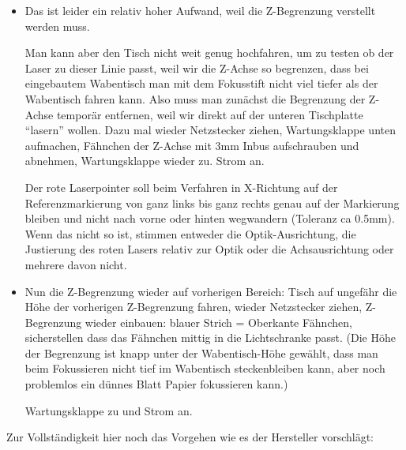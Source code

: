 \documentclass{\basedir/fablab-document}
\begin{document}
	\begin{itemize}
		\item Das ist leider ein relativ hoher Aufwand, weil die Z-Begrenzung verstellt werden muss.

		Man kann aber den Tisch nicht weit genug hochfahren, um zu testen ob der Laser zu dieser Linie passt, weil wir die Z-Achse so begrenzen, dass bei eingebautem Wabentisch man mit dem Fokusstift nicht viel tiefer als der Wabentisch fahren kann. Also muss man zunächst die Begrenzung der Z-Achse temporär entfernen, weil wir direkt auf der unteren Tischplatte \enquote{lasern} wollen. Dazu mal wieder Netzstecker ziehen, Wartungsklappe unten aufmachen, Fähnchen der Z-Achse mit 3mm Inbus aufschrauben und abnehmen, Wartungsklappe wieder zu. Strom an.

		Der rote Laserpointer soll beim Verfahren in X-Richtung auf der Referenzmarkierung von ganz links bis ganz rechts genau auf der Markierung bleiben und nicht nach vorne oder hinten wegwandern (Toleranz ca 0.5mm). Wenn das nicht so ist, stimmen entweder die Optik-Ausrichtung, die Justierung des roten Lasers relativ zur Optik oder die Achsausrichtung oder mehrere davon nicht.

		\item Nun die Z-Begrenzung wieder auf vorherigen Bereich: Tisch auf ungefähr die Höhe der vorherigen Z-Begrenzung fahren, wieder Netzstecker ziehen, Z-Begrenzung wieder einbauen: blauer Strich = Oberkante Fähnchen, sicherstellen dass das Fähnchen mittig in die Lichtschranke passt. (Die Höhe der Begrenzung ist knapp unter der Wabentisch-Höhe gewählt, dass man beim Fokussieren nicht tief im Wabentisch steckenbleiben kann, aber noch problemlos ein dünnes Blatt Papier fokussieren kann.)

		Wartungsklappe zu und Strom an.
	\end{itemize}

Zur Vollständigkeit hier noch das Vorgehen wie es der Hersteller vorschlägt:
\end{document}
